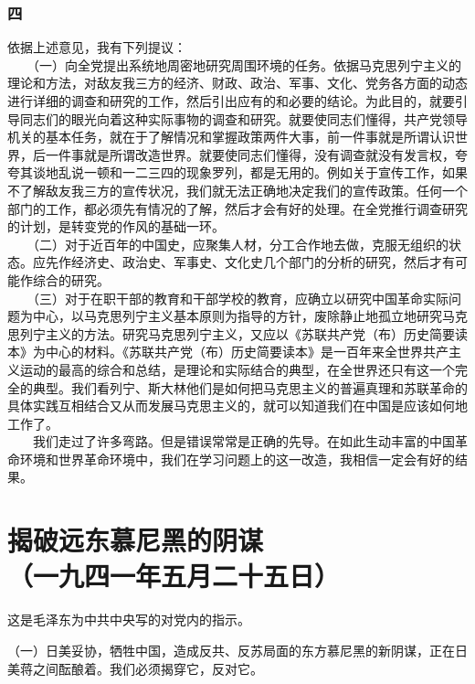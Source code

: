 \documentclass[cn,11pt,chinese]{elegantbook}
\def\myformat#1{\hfil\hfil #1}
\begin{document}
\subsubsection*{\myformat{四}}
依据上述意见，我有下列提议：\\
　　（一）向全党提出系统地周密地研究周围环境的任务。依据马克思列宁主义的理论和方法，对敌友我三方的经济、财政、政治、军事、文化、党务各方面的动态进行详细的调查和研究的工作，然后引出应有的和必要的结论。为此目的，就要引导同志们的眼光向着这种实际事物的调查和研究。就要使同志们懂得，共产党领导机关的基本任务，就在于了解情况和掌握政策两件大事，前一件事就是所谓认识世界，后一件事就是所谓改造世界。就要使同志们懂得，没有调查就没有发言权，夸夸其谈地乱说一顿和一二三四的现象罗列，都是无用的。例如关于宣传工作，如果不了解敌友我三方的宣传状况，我们就无法正确地决定我们的宣传政策。任何一个部门的工作，都必须先有情况的了解，然后才会有好的处理。在全党推行调查研究的计划，是转变党的作风的基础一环。\\
　　（二）对于近百年的中国史，应聚集人材，分工合作地去做，克服无组织的状态。应先作经济史、政治史、军事史、文化史几个部门的分析的研究，然后才有可能作综合的研究。\\
　　（三）对于在职干部的教育和干部学校的教育，应确立以研究中国革命实际问题为中心，以马克思列宁主义基本原则为指导的方针，废除静止地孤立地研究马克思列宁主义的方法。研究马克思列宁主义，又应以《苏联共产党（布）历史简要读本》为中心的材料。《苏联共产党（布）历史简要读本》是一百年来全世界共产主义运动的最高的综合和总结，是理论和实际结合的典型，在全世界还只有这一个完全的典型。我们看列宁、斯大林他们是如何把马克思主义的普遍真理和苏联革命的具体实践互相结合又从而发展马克思主义的，就可以知道我们在中国是应该如何地工作了。\\
　　我们走过了许多弯路。但是错误常常是正确的先导。在如此生动丰富的中国革命环境和世界革命环境中，我们在学习问题上的这一改造，我相信一定会有好的结果。\\
\newpage\section*{\myformat{揭破远东慕尼黑的阴谋}\\\myformat{（一九四一年五月二十五日）}}
\begin{introduction}\item 这是毛泽东为中共中央写的对党内的指示。\end{introduction}
（一）日美妥协，牺牲中国，造成反共、反苏局面的东方慕尼黑的新阴谋，正在日美蒋之间酝酿着。我们必须揭穿它，反对它。\\
\end{document}
